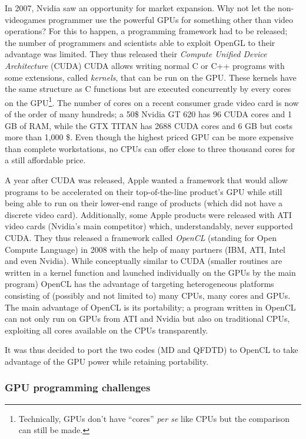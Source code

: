 In 2007, Nvidia saw an opportunity for market expansion. Why not let
the non-videogames programmer use the powerful GPUs for something other than video
operations? For this to happen, a programming framework had to be released; the
number of programmers and scientists able to exploit OpenGL to their advantage
was limited. They thus released their \textit{Compute Unified Device
Architecture} (CUDA)
CUDA allows writing normal C or
C++ programs with some extensions, called \textit{kernels}, that can be run on
the GPU. These kernels have the same structure as C functions but are executed
concurrently by every cores on the GPU\footnote{Technically, GPUs don't have
``cores'' \textit{per se} like CPUs but the comparison can still be made.}. The
number of cores on a recent consumer grade video card is now of the order of
many hundreds; a 50\$ Nvidia GT 620 has 96 CUDA cores and 1 GB of RAM, while the
GTX TITAN has 2688 CUDA cores and 6 GB but costs more than 1,000 \$. Even though
the highest priced GPU can be more expensive than complete workstations, no CPUs
can offer close to three thousand cores for a still affordable price.

A year after CUDA was released, Apple wanted a framework that would allow
programs to be accelerated on their top-of-the-line product's GPU while still
being able to run on their lower-end range of products (which did not have a
discrete video card). Additionally, some Apple products were released with ATI
video cards (Nvidia's main competitor) which, understandably, never supported
CUDA. They thus released a framework called \textit{OpenCL} (standing for
Open Compute Language) in 2008 with the help of many partners (IBM, ATI, Intel
and even Nvidia). While conceptually similar to CUDA (smaller routines are
written in a kernel function and launched individually on the GPUs by the main
program) OpenCL has the advantage of targeting heterogeneous platforms
consisting of (possibly and not limited to) many CPUs, many cores and GPUs. The
main advantage of OpenCL is its portability; a program written in OpenCL can
not only run on GPUs from ATI and Nvidia but also on traditional CPUs,
exploiting all cores available on the CPUs transparently.

It was thus decided to port the two codes (MD and QFDTD) to OpenCL to take
advantage of the GPU power while retaining portability.


\subsubsection{GPU programming challenges}

